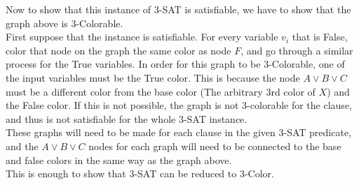 \documentclass{exam} %
\theoremstyle{plain}
\theoremstyle{definition}
\theoremstyle{remark}
\numberwithin{equation}{section}  %
\begin{document}
\begin{questions}
  Now to show that this instance of 3-SAT is satisfiable, we have to show that the 
  graph above is 3-Colorable.\\

  First suppose that the instance is satisfiable. For every variable $v_i$ that
  is False, color that node on the graph the same color as node $F$, and go 
  through a similar process for the True variables. In order for this graph
  to be 3-Colorable, one of the input variables must be the True color. This
  is because the node $A\lor B \lor C$ must be a different color from the base 
  color (The arbitrary 3rd color of $X$) and the False color. If this is not 
  possible, the graph is not 3-colorable for the clause, and thus is not satisfiable
  for the whole 3-SAT instance.\\
  
  These graphs will need to be made for each clause in the given 3-SAT predicate,
  and the $A \lor B \lor C$ nodes for each graph will need to be connected to the
  base and false colors in the same way as the graph above.\\

  This is enough to show that 3-SAT can be reduced to 3-Color.
\end{questions}
\end{document}
